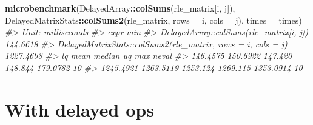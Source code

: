 \documentclass[]{book}
\newenvironment{Shaded}{\begin{snugshade}}{\end{snugshade}}
\newcommand{\KeywordTok}[1]{\textcolor[rgb]{0.13,0.29,0.53}{\textbf{#1}}}
\newcommand{\DataTypeTok}[1]{\textcolor[rgb]{0.13,0.29,0.53}{#1}}
\newcommand{\CommentTok}[1]{\textcolor[rgb]{0.56,0.35,0.01}{\textit{#1}}}
\newcommand{\OperatorTok}[1]{\textcolor[rgb]{0.81,0.36,0.00}{\textbf{#1}}}
\newcommand{\NormalTok}[1]{#1}
\begin{document}
\begin{Shaded}
\begin{Highlighting}[]
\KeywordTok{microbenchmark}\NormalTok{(DelayedArray}\OperatorTok{::}\KeywordTok{colSums}\NormalTok{(rle_matrix[i, j]),}
\NormalTok{               DelayedMatrixStats}\OperatorTok{::}\KeywordTok{colSums2}\NormalTok{(rle_matrix, }\DataTypeTok{rows =}\NormalTok{ i, }\DataTypeTok{cols =}\NormalTok{ j),}
               \DataTypeTok{times =}\NormalTok{ times)}
\CommentTok{#> Unit: milliseconds}
\CommentTok{#>                                                          expr       min}
\CommentTok{#>                       DelayedArray::colSums(rle_matrix[i, j])  144.6618}
\CommentTok{#>  DelayedMatrixStats::colSums2(rle_matrix, rows = i, cols = j) 1227.4698}
\CommentTok{#>         lq      mean   median       uq       max neval}
\CommentTok{#>   146.4575  150.6922  147.420  148.844  179.0782    10}
\CommentTok{#>  1245.4921 1263.5119 1253.124 1269.115 1353.0914    10}
\end{Highlighting}
\end{Shaded}

\section{With delayed ops}\label{with-delayed-ops}
\end{document}
